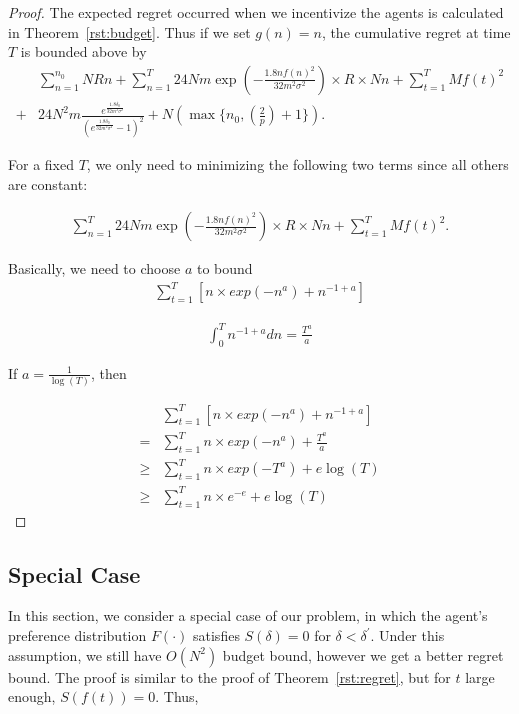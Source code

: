\documentclass{article}
\begin{document}
\begin{proof}
The expected regret occurred when we incentivize the agents is calculated in Theorem~\ref{rst:budget}. Thus if we set $g(n)=n$, the cumulative regret at time $T$ is bounded above by
\begin{align}
&\sum_{n=1}^{n_{0}}NRn + \sum_{n=1}^{T} 24Nm\exp\left(-\frac{1.8n f(n)^2}{32 m^2\sigma^2}\right)\times R \times Nn+ \sum_{t=1}^{T}Mf(t)^2 \nonumber \\
+ & 24N^2 m \frac{e^{\frac{1.8\delta_{0}}{32m^2\sigma^2}}}{(e^{\frac{1.8\delta_{0}}{32m^2\sigma^2}}-1)^2}+N(\max\{n_{0},(\frac{2}{p})+1\}). \nonumber
\end{align}

For a fixed $T$, we only need to minimizing the following two terms since all others are constant:

\begin{align}
\sum_{n=1}^{T} 24Nm\exp\left(-\frac{1.8n f(n)^2}{32 m^2\sigma^2}\right)\times R \times Nn+ \sum_{t=1}^{T}Mf(t)^2.
\end{align}


Basically, we need to choose $a$ to bound
\begin{align}
\sum_{t=1}^{T}\left[n\times exp(-n^a) + n^{-1+a}\right] \nonumber
\end{align}

\begin{align}
\int_{0}^{T}n^{-1+a}dn = \frac{T^{a}}{a} \nonumber 
\end{align}

If $a=\frac{1}{\log(T)}$, then

\begin{align}
&\sum_{t=1}^{T}\left[n\times exp(-n^a) + n^{-1+a}\right] \nonumber \\
= & \sum_{t=1}^{T} n\times exp(-n^a) + \frac{T^{a}}{a} \nonumber \\
\geq & \sum_{t=1}^{T} n\times exp(-T^a) + e\log(T) \nonumber \\
\geq & \sum_{t=1}^{T} n\times e^{-e} + e\log(T) \nonumber
\end{align}

\end{proof}


\subsection{Special Case}

In this section, we consider a special case of our problem, in which the agent's preference distribution $F(\cdot)$ satisfies $S(\delta)=0$ for $\delta<\delta^{'}$. Under this assumption, we still have $O(N^2)$ budget bound, however we get a better regret bound. The proof is similar to the proof of Theorem~\ref{rst:regret}, but for $t$ large enough, $S(f(t))=0$. Thus,
\end{document}
